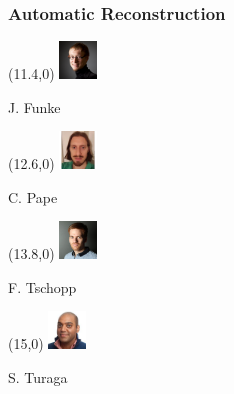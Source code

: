 \documentclass[aspectratio=169,table]{beamer}
\begin{document}
\begin{frame}
    \frametitle{Automatic Reconstruction}

    \begin{textblock}{3}(11.4,0)
        \tiny\includegraphics[width=1cm]{fig/people/funke.png}
        
        J. Funke%
    \end{textblock}%
    
    \begin{textblock}{3}(12.6,0)
        \tiny\includegraphics[width=1cm]{fig/people/papec.png}

        C. Pape%
    \end{textblock}%
    
    \begin{textblock}{3}(13.8,0)
        \tiny\includegraphics[width=1cm]{fig/people/tschopp.jpeg}

        F. Tschopp%
    \end{textblock}%
    
    \begin{textblock}{3}(15,0)
        \tiny\includegraphics[width=1cm]{fig/people/turaga.jpg}

        S. Turaga%
    \end{textblock}%


\end{frame}
\end{document}
